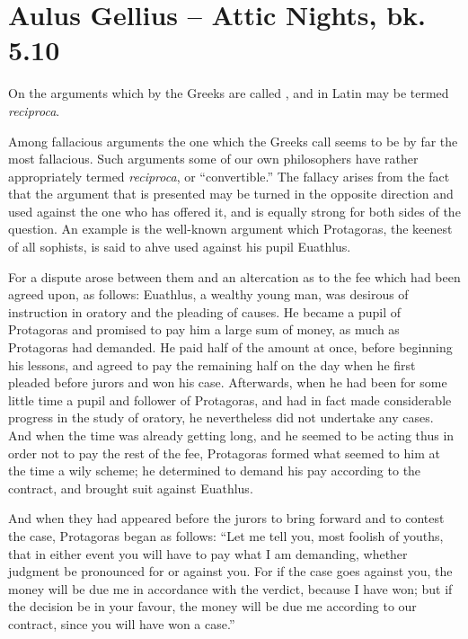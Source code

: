 
\author{Aulus Gellius}
\chapter[Aulus Gellius -- Attic Nights, bk. 5.10]{Aulus Gellius --
Attic Nights, bk. 5.10}


 \begin{center}{\small On the arguments which by the Greeks
are called , and in Latin may be termed
\textit{reciproca}.}\end{center}

\vspace{1\baselineskip}

Among fallacious arguments the one which the Greeks call
 seems to be by far the most fallacious. Such
arguments some of our own philosophers have rather appropriately
termed \textit{reciproca}, or ``convertible.'' The fallacy arises from
the fact that the argument that is presented may be turned in the
opposite direction and used against the one who has offered it, and is
equally strong for both sides of the question. An example is the
well-known argument which Protagoras, the keenest of all sophists, is
said to ahve used against his pupil Euathlus.

 For a dispute arose between them and an altercation as to
the fee which had been agreed upon, as follows: Euathlus, a wealthy
young man, was desirous of instruction in oratory and the pleading of
causes. He became a pupil of Protagoras and promised to pay him a
large sum of money, as much as Protagoras had demanded. He paid half
of the amount at once, before beginning his lessons, and agreed to pay
the remaining half on the day when he first pleaded before jurors and
won his case. Afterwards, when he had been for some little time a
pupil and follower of Protagoras, and had in fact made considerable
progress in the study of oratory, he nevertheless did not undertake
any cases. And when the time was already getting long, and he seemed
to be acting thus in order not to pay the rest of the fee, Protagoras
formed what seemed to him at the time a wily scheme; he determined to
demand his pay according to the contract, and brought suit against
Euathlus.

And when they had appeared before the jurors to bring forward and to
contest the case, Protagoras began as follows: ``Let me tell you, most
foolish of youths, that in either event you will have to pay what I am
demanding, whether judgment be pronounced for or against you. For if
the case goes against you, the money will be due me in accordance with
the verdict, because I have won; but if the decision be in your
favour, the money will be due me according to our contract, since you
will have won a case.''

